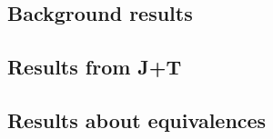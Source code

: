\documentclass[main.tex]{subfiles}
\begin{document}
\begin{appendix}
  \section{Background results}
  \label{sec:background}

  \subsection{Results from J+T}
  \label{ssc:results_from_j_t}

  \subsection{Results about equivalences}
  \label{ssc:results_about_equivalences}
\end{appendix}
\end{document}
